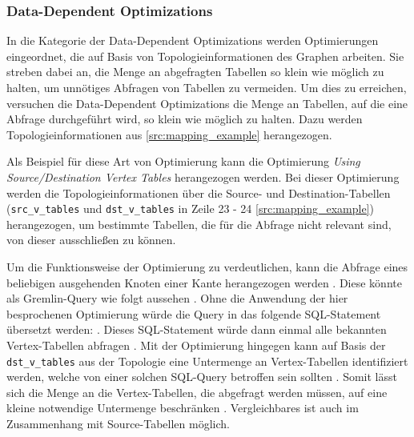 \subsubsection{Data-Dependent Optimizations}
In die Kategorie der Data-Dependent Optimizations werden Optimierungen eingeordnet, die auf Basis von Topologieinformationen des Graphen arbeiten. Sie streben dabei an, die Menge an abgefragten Tabellen so klein wie möglich zu halten, um unnötiges Abfragen von Tabellen zu vermeiden. Um dies zu erreichen, versuchen die Data-Dependent Optimizations die Menge an Tabellen, auf die eine Abfrage durchgeführt wird, so klein wie möglich zu halten. Dazu werden Topologieinformationen aus \autoref{src:mapping_example} herangezogen. 

Als Beispiel für diese Art von Optimierung kann die Optimierung \textit{Using Source/Destination Vertex Tables} herangezogen werden. Bei dieser Optimierung werden die Topologieinformationen über die Source- und Destination-Tabellen (\texttt{src\_v\_tables} und \texttt{dst\_v\_tables} in Zeile 23 - 24 \autoref{src:mapping_example}) herangezogen, um bestimmte Tabellen, die für die Abfrage nicht relevant sind, von dieser ausschließen zu können.

Um die Funktionsweise der Optimierung zu verdeutlichen, kann die Abfrage eines beliebigen ausgehenden Knoten einer Kante herangezogen werden \cite{sigmod_tian}. Diese könnte als Gremlin-Query wie folgt aussehen  \cite{sigmod_tian}. Ohne die Anwendung der hier besprochenen Optimierung würde die Query in das folgende SQL-Statement übersetzt werden:  \cite{sigmod_tian}. Dieses SQL-Statement würde dann einmal alle bekannten Vertex-Tabellen abfragen \cite{sigmod_tian}. Mit der Optimierung hingegen kann auf Basis der \texttt{dst\_v\_tables} aus der Topologie eine Untermenge an Vertex-Tabellen identifiziert werden, welche von einer solchen SQL-Query betroffen sein sollten \cite{sigmod_tian}. Somit lässt sich die Menge an die Vertex-Tabellen, die abgefragt werden müssen, auf eine kleine notwendige Untermenge beschränken \cite{sigmod_tian}. Vergleichbares ist auch im Zusammenhang mit Source-Tabellen möglich.


